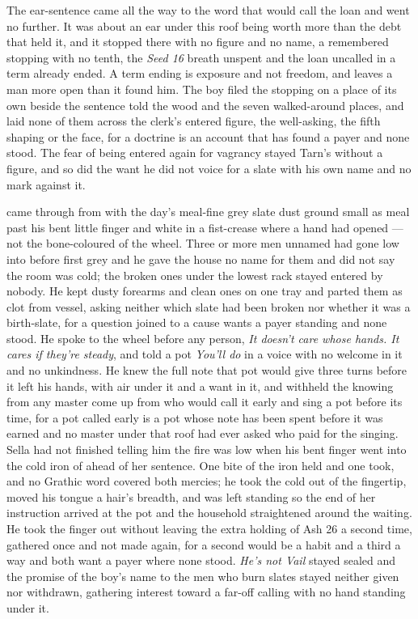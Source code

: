 The ear-sentence came all the way to the word that would call the loan and went no further. It was about an ear under this roof being worth more than the debt that held it, and it stopped there with no figure and no name, a remembered stopping with no tenth, the \emph{Seed 16} breath unspent and the loan uncalled in a term already ended. A term ending is exposure and not freedom, and leaves a man more open than it found him. The boy filed the stopping on a place of its own beside the sentence told the wood and the seven walked-around places, and laid none of them across the clerk's entered figure, the well-asking, the fifth shaping or the face, for a doctrine is an account that has found a payer and none stood. The fear of being entered again for vagrancy stayed Tarn's without a figure, and so did the want he did not voice for a slate with his own name and no mark against it.

 came through  from  with the day's meal-fine grey slate dust ground small as meal past his bent little finger and white in a fist-crease where a hand had opened --- not the bone-coloured  of the wheel. Three or more men unnamed had gone low into  before first grey and he gave the house no name for them and did not say the room was cold; the broken ones under the lowest rack stayed entered by nobody. He kept dusty forearms and clean ones on one tray and parted them as clot from vessel, asking neither which slate had been broken nor whether it was a birth-slate, for a question joined to a cause wants a payer standing and none stood. He spoke to the wheel before any person, \emph{It doesn't care whose hands. It cares if they're steady}, and told a pot \emph{You'll do} in a voice with no welcome in it and no unkindness. He knew the full note that pot would give three turns before it left his hands, with air under it and a want in it, and withheld the knowing from any master come up from  who would call it early and sing a pot before its time, for a pot called early is a pot whose note has been spent before it was earned and no master under that roof had ever asked who paid for the singing. Sella had not finished telling him the fire was low when his bent finger went into the cold iron of  ahead of her sentence. One bite of the iron held and one took, and no Grathic word covered both mercies; he took the cold out of the fingertip, moved his tongue a hair's breadth, and was left standing so the end of her instruction arrived at the pot and the household straightened around the waiting. He took the finger out without leaving the extra holding of Ash 26 a second time, gathered once and not made again, for a second would be a habit and a third a way and both want a payer where none stood. \emph{He's not Vail} stayed sealed and the promise of the boy's name to the men who burn slates stayed neither given nor withdrawn, gathering interest toward a far-off calling with no hand standing under it.

